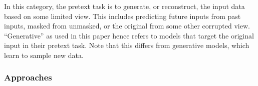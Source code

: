 
In this category, the pretext task is to generate, or reconstruct, the input data based on some limited view. This includes predicting future inputs from past inputs, masked from unmasked, or the original from some other corrupted view.  ``Generative'' as used in this paper hence refers to models that target the original input in their pretext task. Note that this differs from generative models, which learn  to sample new data.


\subsubsection{Approaches}


